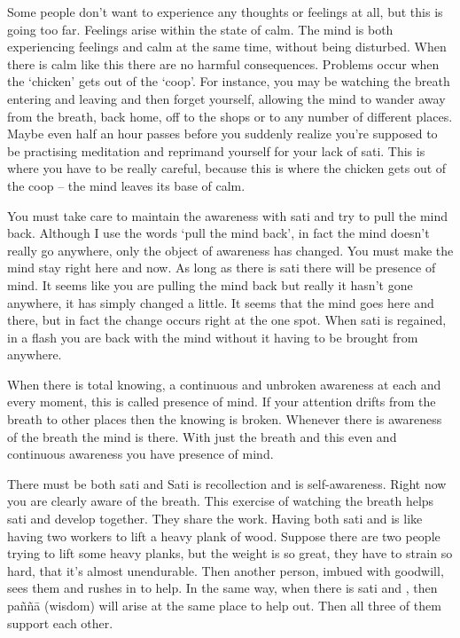 Some people don't want to experience any thoughts or feelings at all, but this is going too far. Feelings arise within the state of calm. The mind is both experiencing feelings and calm at the same time, without being disturbed. When there is calm like this there are no harmful consequences. Problems occur when the `chicken' gets out of the `coop'. For instance, you may be watching the breath entering and leaving and then forget yourself, allowing the mind to wander away from the breath, back home, off to the shops or to any number of different places. Maybe even half an hour passes before you suddenly realize you're supposed to be practising meditation and reprimand yourself for your lack of sati. This is where you have to be really careful, because this is where the chicken gets out of the coop -- the mind leaves its base of calm. 

You must take care to maintain the awareness with sati and try to pull the mind back. Although I use the words `pull the mind back', in fact the mind doesn't really go anywhere, only the object of awareness has changed. You must make the mind stay right here and now. As long as there is sati there will be presence of mind. It seems like you are pulling the mind back but really it hasn't gone anywhere, it has simply changed a little. It seems that the mind goes here and there, but in fact the change occurs right at the one spot. When sati is regained, in a flash you are back with the mind without it having to be brought from anywhere. 

When there is total knowing, a continuous and unbroken awareness at each and every moment, this is called presence of mind. If your attention drifts from the breath to other places then the knowing is broken. Whenever there is awareness of the breath the mind is there. With just the breath and this even and continuous awareness you have presence of mind. 

There must be both sati and  Sati is recollection and  is self-awareness. Right now you are clearly aware of the breath. This exercise of watching the breath helps sati and  develop together. They share the work. Having both sati and  is like having two workers to lift a heavy plank of wood. Suppose there are two people trying to lift some heavy planks, but the weight is so great, they have to strain so hard, that it's almost unendurable. Then another person, imbued with goodwill, sees them and rushes in to help. In the same way, when there is sati and , then pa\~n\~n\=a (wisdom) will arise at the same place to help out. Then all three of them support each other. 

